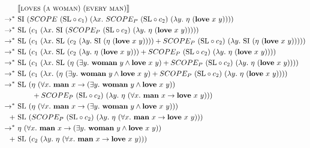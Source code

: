 \documentclass{article}
\newcommand{\abs}[1]{\textsc{#1}}
\newcommand{\obj}[1]{\textbf{#1}}
\newcommand{\sem}[1]{\llbracket #1 \rrbracket}
\begin{document}
\begin{align*}
  & \sem{\abs{loves}\ (\abs{a}\ \abs{woman})\ (\abs{every}\ \abs{man})} \\
  \rightarrow^*\ & \mathrm{SI}\ (SCOPE\ (\mathrm{SL} \circ c_1)\ 
  (\lambda x.\ SCOPE_P\ (\mathrm{SL} \circ c_2)\
  (\lambda y.\ \eta\ (\obj{love}\ x\ y)))) \\
  \rightarrow^*\ & \mathrm{SL}\ (c_1\
  (\lambda x.\ \mathrm{SI}\ (SCOPE_P\ (\mathrm{SL} \circ c_2)\
  (\lambda y.\ \eta\ (\obj{love}\ x\ y))))) \\
  \rightarrow^*\ & \mathrm{SL}\ (c_1\
  (\lambda x.\ \mathrm{SL}\ (c_2\ 
  (\lambda y.\ \mathrm{SI}\ (\eta\ (\obj{love}\ x\ y)))) +
  SCOPE_P\ (\mathrm{SL} \circ c_2)\
  (\lambda y.\ \mathrm{SI}\ (\eta\ (\obj{love}\ x\ y))))) \\
  \rightarrow^*\ & \mathrm{SL}\ (c_1\
  (\lambda x.\ \mathrm{SL}\ (c_2\ 
  (\lambda y.\ \eta\ (\obj{love}\ x\ y))) +
  SCOPE_P\ (\mathrm{SL} \circ c_2)\
  (\lambda y.\ \eta\ (\obj{love}\ x\ y)))) \\
  \rightarrow^*\ & \mathrm{SL}\ (c_1\ (\lambda x.\ 
  \mathrm{SL}\ (\eta\ (\exists y.\ \obj{woman}\ y \land \obj{love}\ x\ y) +
  SCOPE_P\ (\mathrm{SL} \circ c_2)\
  (\lambda y.\ \eta\ (\obj{love}\ x\ y)))) \\
  \rightarrow^*\ & \mathrm{SL}\ (c_1\ (\lambda x.\ 
  (\eta\ (\exists y.\ \obj{woman}\ y \land \obj{love}\ x\ y) +
  SCOPE_P\ (\mathrm{SL} \circ c_2)\
  (\lambda y.\ \eta\ (\obj{love}\ x\ y)))) \\
  \rightarrow^*\ & \mathrm{SL}\ (\eta\ (\forall x.\ \obj{man}\ x
  \rightarrow (\exists y.\ \obj{woman}\ y \land \obj{love}\ x\ y)) \\
  & \hspace{7mm} + SCOPE_P\ (\mathrm{SL} \circ c_2)\ (\lambda y.\ 
  \eta\ (\forall x.\ \obj{man}\ x \rightarrow \obj{love}\ x\ y))) \\
  \rightarrow^*\ & \mathrm{SL}\ (\eta\ (\forall x.\ \obj{man}\ x
  \rightarrow (\exists y.\ \obj{woman}\ y \land \obj{love}\ x\ y))) \\
  +\ & \mathrm{SL}\ (SCOPE_P\ (\mathrm{SL} \circ c_2)\ (\lambda y.\
  \eta\ (\forall x.\ \obj{man}\ x \rightarrow \obj{love}\ x\ y))) \\
  \rightarrow^*\ & \eta\ (\forall x.\ \obj{man}\ x
  \rightarrow (\exists y.\ \obj{woman}\ y \land \obj{love}\ x\ y)) \\
  +\ & \mathrm{SL}\ (c_2\ (\lambda y.\ \eta\ (\forall x.\
  \obj{man}\ x \rightarrow \obj{love}\ x\ y))) \\

\end{align*}
\end{document}
